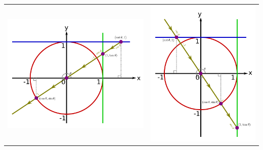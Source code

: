 \documentclass{article}
\begin{document}
\begin{tabular}{cc}
\includegraphics[scale = 0.6]{unit_circle_trig_functions_reflex_angle_1} & 
\includegraphics[scale = 0.6]{unit_circle_trig_functions_reflex_angle_2} \\
\end{tabular}
\end{document}
